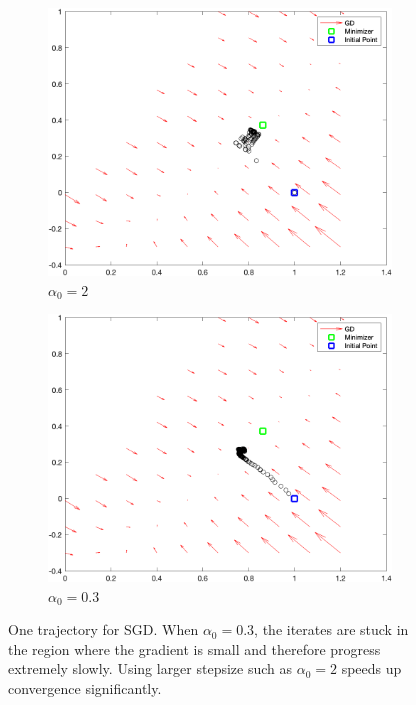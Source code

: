 \documentclass{article}
\begin{document}
\begin{figure} 
	\begin{subfigure}[b]{.5\linewidth}
		\centering\large 	\includegraphics[width=\linewidth]{figs/Q3/a2_traj}
		\caption{$ \alpha_0 = 2 $}
	\end{subfigure}%
	\begin{subfigure}[b]{.515\linewidth}
		\centering\large 	\includegraphics[width=\linewidth]{figs/Q3/a03_traj}
		\caption{$ \alpha_0 = 0.3 $}
	\end{subfigure}
	\caption{One trajectory for SGD. When $ \alpha_0 = 0.3 $, the iterates are stuck in the region where the gradient is small and therefore progress extremely slowly. Using larger stepsize such as $ \alpha_0 =2$ speeds up convergence significantly.}\label{fig: Q3_choose_alpha}
\end{figure}
\end{document}
